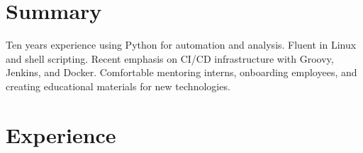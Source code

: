 \documentclass[12pt,letterpaper]{article}
\newcommand{\ResumeSection}[1]{\section*{{\color{MidnightBlue}#1 \sout{\hfill}}}}
\begin{document}

\ResumeSection{Summary}

Ten years experience using Python for automation and analysis. Fluent in Linux and shell scripting. Recent emphasis on CI/CD infrastructure with Groovy, Jenkins, and Docker. Comfortable mentoring interns, onboarding employees, and creating educational materials for new technologies.




\ResumeSection{Experience}
\end{document}

